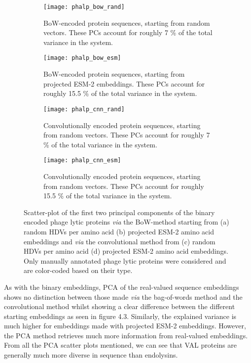 \begin{figure}[h!]
    \centering
    \begin{subfigure}{0.48\textwidth}
        \texttt{[image: phalp\_bow\_rand]}
        \caption{BoW-encoded protein sequences, starting from random vectors. These PCs account for roughly 7 \% of the total variance in the system.}
    \label{fig:phalpbowrand}
    \end{subfigure}
    \hfill
    \begin{subfigure}{0.48\textwidth}
        \texttt{[image: phalp\_bow\_esm]}
        \caption{BoW-encoded protein sequences, starting from projected ESM-2 embeddings. These PCs account for roughly 15.5 \% of the total variance in the system.}
    \label{fig:phalpbowesm}
    \end{subfigure}
    
    \begin{subfigure}{0.48\textwidth}
        \texttt{[image: phalp\_cnn\_rand]}
        \caption{Convolutionally encoded protein sequences, starting from random vectors. These PCs account for roughly 7 \% of the total variance in the system.}
    \label{fig:phalpcnnrand}
    \end{subfigure}
    \hfill
    \begin{subfigure}{0.48\textwidth}
        \texttt{[image: phalp\_cnn\_esm]}
        \caption{Convolutionally encoded protein sequences, starting from random vectors. These PCs account for roughly 15.5 \% of the total variance in the system.}
    \label{fig:phalpcnnesm}
    \end{subfigure}
    \caption{Scatter-plot of the first two principal components of the binary encoded phage lytic proteins \textit{via} the BoW-method starting from (a) random HDVs per amino acid (b) projected ESM-2 amino acid embeddings and \textit{via} the convolutional method from (c) random HDVs per amino acid (d) projected ESM-2 amino acid embeddings. Only manually annotated phage lytic proteins were considered and are color-coded based on their type.}
    \label{fig:phalp_emb}
\end{figure}

As with the binary embeddings, PCA of the real-valued sequence embeddings shows no distinction between those made \textit{via} the bag-of-words method and the convolutional method whilst showing a clear difference between the different starting embeddings as seen in figure 4.3. Similarly, the explained variance is much higher for embeddings made with projected ESM-2 embeddings. However, the PCA method retrieves much more information from real-valued embeddings. From all the PCA scatter plots mentioned, we can see that VAL proteins are generally much more diverse in sequence than endolysins.

